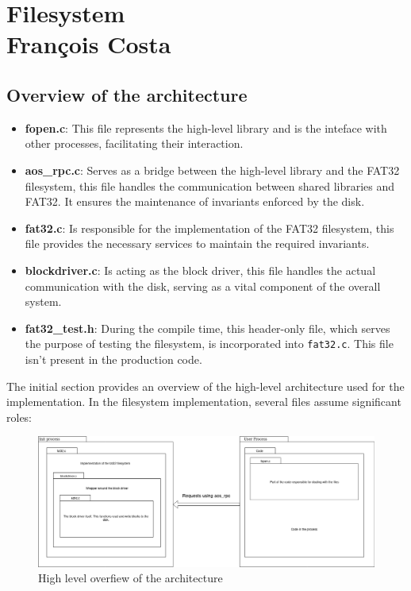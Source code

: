 \chapter[Filesystem]{Filesystem \\ \Large \textnormal{François Costa}}

\section{Overview of the architecture}

\begin{itemize}
    \item \textbf{fopen.c}: This file represents the high-level library and is the inteface with other processes, facilitating their interaction.

    \item \textbf{aos\_rpc.c}: Serves as a bridge between the high-level library and the FAT32 filesystem, this file handles the communication between shared libraries and FAT32. It ensures the maintenance of invariants enforced by the disk.

    \item \textbf{fat32.c}: Is responsible for the implementation of the FAT32 filesystem, this file provides the necessary services to maintain the required invariants.

    \item \textbf{blockdriver.c}: Is acting as the block driver, this file handles the actual communication with the disk, serving as a vital component of the overall system.

    \item \textbf{fat32\_test.h}: During the compile time, this header-only file, which serves the purpose of testing the filesystem, is incorporated into \texttt{fat32.c}. This file isn't present in the production code.

\end{itemize}

The initial section provides an overview of the high-level architecture used for the implementation. In the filesystem implementation, several files assume significant roles:
 
\begin{figure}[htp]
    \centering
    \includegraphics[width=12cm]{images/filesystem/high_level overview.drawio.png}
    \caption{High level overfiew of the architecture}
    \label{fig:galaxy}
\end{figure}


